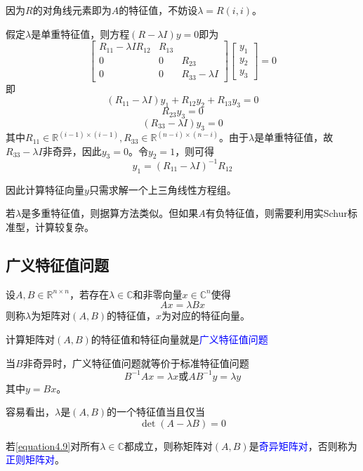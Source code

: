 \documentclass[12pt,a4paper]{article}
\begin{document}
因为$R$的对角线元素即为$A$的特征值，不妨设$\lambda=R(i,i)$。

假定$\lambda$是单重特征值，则方程$(R-\lambda I)y=0$即为$$
\left[\begin{array}{ccc}{R_{11}-\lambda I R_{12}} & {R_{13}} \\ {0} & {0} & {R_{23}} \\ {0} & {0} & {R_{33}-\lambda I}\end{array}\right]\left[\begin{array}{l}{y_{1}} \\ {y_{2}} \\ {y_{3}}\end{array}\right]=0
$$即\begin{equation}
\left(R_{11}-\lambda I\right) y_{1}+R_{12} y_{2}+R_{13} y_{3}=0
\end{equation}\begin{equation}
R_{23} y_{3}=0
\end{equation}\begin{equation}
\left(R_{33}-\lambda I\right) y_{3}=0
\end{equation}其中$R_{11} \in \mathbb{R}^{(i-1) \times(i-1)}, R_{33} \in \mathbb{R}^{(n-i) \times(n-i)}$。由于$\lambda$是单重特征值，故
$R_{33}-\lambda I$非奇异，因此$y_3=0$。令$y_2=1$，则可得$$
y_{1}=\left(R_{11}-\lambda I\right)^{-1} R_{12}
$$

因此计算特征向量$y$只需求解一个上三角线性方程组。

若$\lambda$是多重特征值，则据算方法类似。但如果$A$有负特征值，则需要利用实Schur标准型，计算较复杂。
\subsection{广义特征值问题}
设$A, B \in \mathbb{R}^{n \times n}$，若存在$\lambda \in \mathbb{C}$和非零向量$x \in \mathbb{C}^{n}$使得$$
A x=\lambda B x
$$则称$\lambda$为矩阵对$(A,B)$的特征值，$x$为对应的特征向量。

计算矩阵对$(A,B)$的特征值和特征向量就是\textcolor{blue}{广义特征值问题}

当$B$非奇异时，广义特征值问题就等价于标准特征值问题$$
B^{-1} A x=\lambda x
\text{或}A B^{-1} y=\lambda y
$$其中$y=Bx$。

容易看出，$\lambda$是$(A,B)$的一个特征值当且仅当\begin{equation}
\operatorname{det}(A-\lambda B)=0
\label{equation4.9}
\end{equation}

若\ref{equation4.9}对所有$\lambda \in \mathbb{C}$都成立，则称矩阵对$(A,B)$是\textcolor{blue}{奇异矩阵对}，否则称为\textcolor{blue}{正则矩阵对}。
\end{document}
